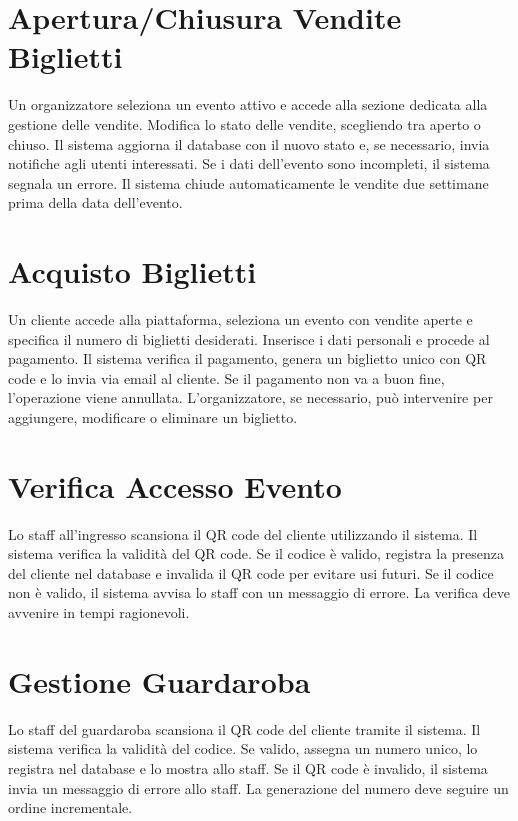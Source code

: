 \documentclass[a4paper,12pt]{article}
\begin{document}
\section{\textcolor{sectioncolor}{Apertura/Chiusura Vendite Biglietti}}
\textcolor{textcolor}{
Un organizzatore seleziona un evento attivo e accede alla sezione dedicata alla gestione delle vendite. Modifica lo stato delle vendite, scegliendo tra aperto o chiuso. Il sistema aggiorna il database con il nuovo stato e, se necessario, invia notifiche agli utenti interessati. Se i dati dell’evento sono incompleti, il sistema segnala un errore. Il sistema chiude automaticamente le vendite due settimane prima della data dell’evento.
}

\section{\textcolor{sectioncolor}{Acquisto Biglietti}}
\textcolor{textcolor}{
Un cliente accede alla piattaforma, seleziona un evento con vendite aperte e specifica il numero di biglietti desiderati. Inserisce i dati personali e procede al pagamento. Il sistema verifica il pagamento, genera un biglietto unico con QR code e lo invia via email al cliente. Se il pagamento non va a buon fine, l’operazione viene annullata. L’organizzatore, se necessario, può intervenire per aggiungere, modificare o eliminare un biglietto.
}

\section{\textcolor{sectioncolor}{Verifica Accesso Evento}}
\textcolor{textcolor}{
Lo staff all'ingresso scansiona il QR code del cliente utilizzando il sistema. Il sistema verifica la validità del QR code. Se il codice è valido, registra la presenza del cliente nel database e invalida il QR code per evitare usi futuri. Se il codice non è valido, il sistema avvisa lo staff con un messaggio di errore. La verifica deve avvenire in tempi ragionevoli.
}

\section{\textcolor{sectioncolor}{Gestione Guardaroba}}
\textcolor{textcolor}{
Lo staff del guardaroba scansiona il QR code del cliente tramite il sistema. Il sistema verifica la validità del codice. Se valido, assegna un numero unico, lo registra nel database e lo mostra allo staff. Se il QR code è invalido, il sistema invia un messaggio di errore allo staff. La generazione del numero deve seguire un ordine incrementale.
}
\end{document}
